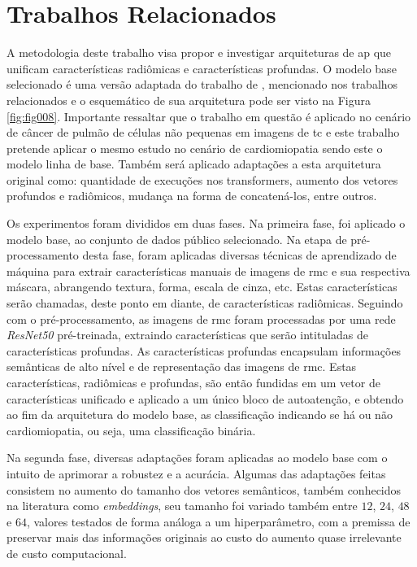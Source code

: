 \chapter{Trabalhos Relacionados}
\label{chap:metodologia}
\vspace{-\baselineskip} %


A metodologia deste trabalho visa propor e investigar arquiteturas de \gls{ap} que unificam características radiômicas e características profundas. O modelo base selecionado é uma versão adaptada do trabalho de \cite{aiSelfAttentionBasedFusion2023}, mencionado nos trabalhos relacionados e o esquemático de sua arquitetura pode ser visto na Figura \ref{fig:fig008}. Importante ressaltar que o trabalho em questão é aplicado no cenário de câncer de pulmão de células não pequenas em imagens de \gls{tc} e este trabalho pretende aplicar o mesmo estudo no cenário de cardiomiopatia sendo este o modelo linha de base. Também será aplicado adaptações a esta arquitetura original como: quantidade de execuções nos transformers, aumento dos vetores profundos e radiômicos, mudança na forma de concatená-los, entre outros.

 Os experimentos foram divididos em duas fases. Na primeira fase, foi aplicado o modelo base, ao conjunto de dados público selecionado. Na etapa de pré-processamento desta fase, foram aplicadas diversas técnicas de aprendizado de máquina para extrair características manuais de imagens de \gls{rmc} e sua respectiva máscara, abrangendo textura, forma, escala de cinza, etc. Estas características serão chamadas, deste ponto em diante, de características radiômicas. Seguindo com o pré-processamento, as imagens de \gls{rmc} foram processadas por uma rede \textit{ResNet50} pré-treinada, extraindo características que serão intituladas de características profundas. As características profundas encapsulam informações semânticas de alto nível e de representação das imagens de \gls{rmc}. Estas características, radiômicas e profundas, são então fundidas em um vetor de características unificado e aplicado a um único bloco de autoatenção, e obtendo ao fim da arquitetura do modelo base, as classificação indicando se há ou não cardiomiopatia, ou seja, uma classificação binária.

Na segunda fase, diversas adaptações foram aplicadas ao modelo base com o intuito de aprimorar a robustez e a acurácia. Algumas das adaptações feitas consistem no aumento do tamanho dos vetores semânticos, também conhecidos na literatura como \textit{embeddings}, seu tamanho foi variado também entre $12$, $24$, $48$ e $64$, valores testados de forma análoga a um hiperparâmetro, com a premissa de preservar mais das informações originais ao custo do aumento quase irrelevante de custo computacional.

